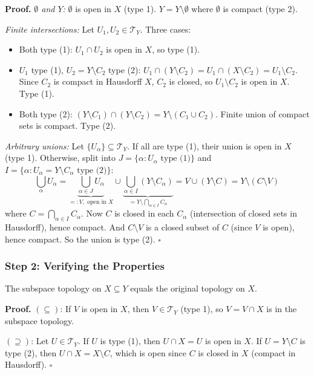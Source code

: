 \documentclass[11pt]{report}
\renewenvironment{proof}[1][Proof]{\noindent\textbf{#1.} }{\hfill$\square$\par\vspace{5pt}}
\begin{document}
\begin{proof}
\textit{$\emptyset$ and $Y$:} $\emptyset$ is open in $X$ (type 1). $Y = Y \setminus \emptyset$ where $\emptyset$ is compact (type 2). \checkmark

\textit{Finite intersections:} Let $U_1, U_2 \in \mathcal{T}_Y$. Three cases:
\begin{itemize}[nosep]
    \item Both type (1): $U_1 \cap U_2$ is open in $X$, so type (1). \checkmark
    \item $U_1$ type (1), $U_2 = Y \setminus C_2$ type (2): $U_1 \cap (Y \setminus C_2) = U_1 \cap (X \setminus C_2) = U_1 \setminus C_2$. Since $C_2$ is compact in Hausdorff $X$, $C_2$ is closed, so $U_1 \setminus C_2$ is open in $X$. Type (1). \checkmark
    \item Both type (2): $(Y \setminus C_1) \cap (Y \setminus C_2) = Y \setminus (C_1 \cup C_2)$. Finite union of compact sets is compact. Type (2). \checkmark
\end{itemize}

\textit{Arbitrary unions:} Let $\{U_\alpha\} \subseteq \mathcal{T}_Y$. If all are type (1), their union is open in $X$ (type 1). Otherwise, split into $J = \{\alpha : U_\alpha \text{ type (1)}\}$ and $I = \{\alpha : U_\alpha = Y \setminus C_\alpha \text{ type (2)}\}$:
\[\bigcup_\alpha U_\alpha = \underbrace{\bigcup_{\alpha \in J} U_\alpha}_{=: V,\text{ open in }X} \cup \underbrace{\bigcup_{\alpha \in I} (Y \setminus C_\alpha)}_{= Y \setminus \bigcap_{\alpha \in I} C_\alpha} = V \cup (Y \setminus C) = Y \setminus (C \setminus V)\]
where $C = \bigcap_{\alpha \in I} C_\alpha$. Now $C$ is closed in each $C_\alpha$ (intersection of closed sets in Hausdorff), hence compact. And $C \setminus V$ is a closed subset of $C$ (since $V$ is open), hence compact. So the union is type (2). \checkmark
\end{proof}

\subsubsection*{Step 2: Verifying the Properties}

\begin{propbox}[$X$ is a Subspace of $Y$]
The subspace topology on $X \subseteq Y$ equals the original topology on $X$.
\end{propbox}

\begin{proof}
$(\subseteq)$: If $V$ is open in $X$, then $V \in \mathcal{T}_Y$ (type 1), so $V = V \cap X$ is in the subspace topology.

$(\supseteq)$: Let $U \in \mathcal{T}_Y$. If $U$ is type (1), then $U \cap X = U$ is open in $X$. If $U = Y \setminus C$ is type (2), then $U \cap X = X \setminus C$, which is open since $C$ is closed in $X$ (compact in Hausdorff).
\end{proof}
\end{document}
